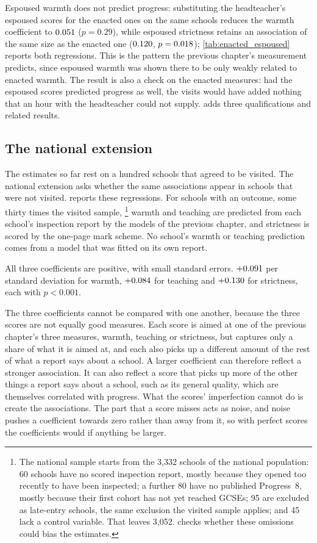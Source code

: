 Espoused warmth does not predict progress: substituting the headteacher's espoused scores for the enacted ones on the same schools reduces the warmth coefficient to $0.051$ ($p = 0.29$), while espoused
strictness retains an association of the same size as the enacted one
($0.120$, $p = 0.018$); \cref{tab:enacted_espoused} reports both regressions. This is the pattern the previous chapter's measurement predicts, since espoused warmth was shown there to be only weakly related to enacted warmth. The result is also a check on the enacted measures: had the espoused scores predicted progress as well, the visits would have added nothing that an hour with the headteacher could not supply.  adds three qualifications and related results.



\subsection{The national extension}

The estimates so far rest on a hundred schools that agreed to be visited. The national extension asks whether the same associations appear in schools that were not visited.  reports these regressions. For \NNationalStrictness{}
schools with an outcome, some thirty times the visited sample,%
\footnote{The national sample starts from the 3,332 schools of the national population: 60 schools have no scored inspection report, mostly because they opened too recently to have been inspected; a further 80 have no published Progress~8, mostly because their first cohort has not yet reached GCSEs; 95 are excluded as late-entry schools, the same exclusion the visited sample applies; and 45 lack a control variable. That leaves 3,052.  checks whether these omissions could bias the estimates.} warmth
and teaching are predicted from each school's inspection report by the
models of the previous chapter, and strictness is scored by the one-page mark scheme. No school's warmth or teaching prediction comes from a model that was fitted on its own report.

All three coefficients are positive, with small standard errors.
$+0.091$ per standard deviation for warmth, $+0.084$ for teaching and
$+0.130$ for strictness, each with $p < 0.001$.

The three coefficients cannot be compared with one another, because the three scores are not equally good measures. Each score is aimed at one of the previous chapter's three measures, warmth, teaching or strictness, but captures only a share of what it is aimed at, and each also picks up a different amount of the rest of what a report says about a school. A larger coefficient can therefore reflect a stronger association. It can also reflect a score that picks up more of the other things a report says about a school, such as its general quality, which are themselves correlated with progress. What the scores' imperfection cannot do is create the associations. The part that a score misses acts as noise, and noise pushes a coefficient towards zero rather than away from it, so with perfect scores the coefficients would if anything be larger.

